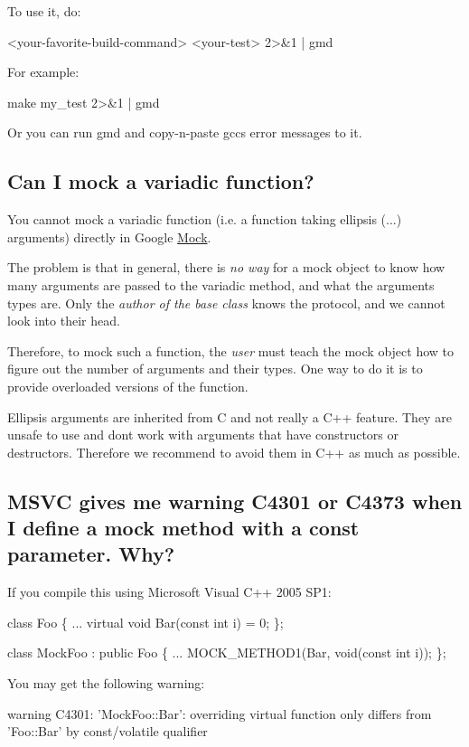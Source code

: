 To use it, do\+: 
\begin{DoxyCode}
<your-favorite-build-command> <your-test> 2>&1 | gmd
\end{DoxyCode}


For example\+: 
\begin{DoxyCode}
make my\_test 2>&1 | gmd
\end{DoxyCode}


Or you can run {\ttfamily gmd} and copy-\/n-\/paste gcc\textquotesingle{}s error messages to it.

\subsection*{Can I mock a variadic function?}

You cannot mock a variadic function (i.\+e. a function taking ellipsis ({\ttfamily ...}) arguments) directly in Google \hyperlink{classMock}{Mock}.

The problem is that in general, there is {\itshape no way} for a mock object to know how many arguments are passed to the variadic method, and what the arguments\textquotesingle{} types are. Only the {\itshape author of the base class} knows the protocol, and we cannot look into their head.

Therefore, to mock such a function, the {\itshape user} must teach the mock object how to figure out the number of arguments and their types. One way to do it is to provide overloaded versions of the function.

Ellipsis arguments are inherited from C and not really a C++ feature. They are unsafe to use and don\textquotesingle{}t work with arguments that have constructors or destructors. Therefore we recommend to avoid them in C++ as much as possible.

\subsection*{M\+S\+VC gives me warning C4301 or C4373 when I define a mock method with a const parameter. Why?}

If you compile this using Microsoft Visual C++ 2005 S\+P1\+: 
\begin{DoxyCode}
\textcolor{keyword}{class }Foo \{
  ...
  \textcolor{keyword}{virtual} \textcolor{keywordtype}{void} Bar(\textcolor{keyword}{const} \textcolor{keywordtype}{int} i) = 0;
\};

\textcolor{keyword}{class }MockFoo : \textcolor{keyword}{public} Foo \{
  ...
  MOCK\_METHOD1(Bar, \textcolor{keywordtype}{void}(\textcolor{keyword}{const} \textcolor{keywordtype}{int} i));
\};
\end{DoxyCode}
 You may get the following warning\+: 
\begin{DoxyCode}
warning C4301: 'MockFoo::Bar': overriding virtual function only differs from 'Foo::Bar' by const/volatile
       qualifier
\end{DoxyCode}


